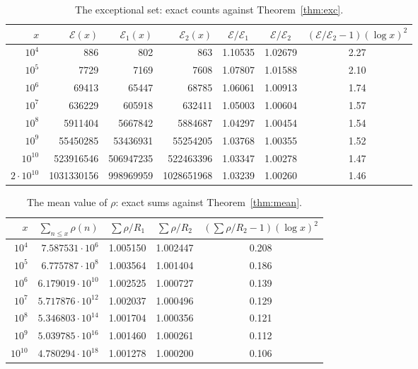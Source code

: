 \documentclass[11pt]{article}
\theoremstyle{definition}
\newcommand{\E}{\mathcal{E}}
\begin{document}
\begin{table}[htbp]
\centering
\caption{The exceptional set: exact counts against Theorem~\ref{thm:exc}.}
\label{tab:exc}
\small
\begin{tabular}{rrrrccc}
\toprule
$x$ & $\E(x)$ & $\E_1(x)$ & $\E_2(x)$ & $\E/\E_1$ & $\E/\E_2$ & $(\E/\E_2-1)(\log x)^2$\\
\midrule
$10^{4}$ & 886 & 802 & 863 & 1.10535 & 1.02679 & 2.27 \\
$10^{5}$ & 7729 & 7169 & 7608 & 1.07807 & 1.01588 & 2.10 \\
$10^{6}$ & 69413 & 65447 & 68785 & 1.06061 & 1.00913 & 1.74 \\
$10^{7}$ & 636229 & 605918 & 632411 & 1.05003 & 1.00604 & 1.57 \\
$10^{8}$ & 5911404 & 5667842 & 5884687 & 1.04297 & 1.00454 & 1.54 \\
$10^{9}$ & 55450285 & 53436931 & 55254205 & 1.03768 & 1.00355 & 1.52 \\
$10^{10}$ & 523916546 & 506947235 & 522463396 & 1.03347 & 1.00278 & 1.47 \\
$2\cdot10^{10}$ & 1031330156 & 998969959 & 1028651968 & 1.03239 & 1.00260 & 1.46 \\
\bottomrule
\end{tabular}
\end{table}

\begin{table}[htbp]
\centering
\caption{The mean value of $\rho$: exact sums against Theorem~\ref{thm:mean}.}
\label{tab:mean}
\small
\begin{tabular}{rrccc}
\toprule
$x$ & $\sum_{n\le x}\rho(n)$ & $\sum\rho/R_1$ & $\sum\rho/R_2$ & $(\sum\rho/R_2-1)(\log x)^2$\\
\midrule
$10^{4}$ & $7.587531\cdot10^{6}$ & 1.005150 & 1.002447 & 0.208 \\
$10^{5}$ & $6.775787\cdot10^{8}$ & 1.003564 & 1.001404 & 0.186 \\
$10^{6}$ & $6.179019\cdot10^{10}$ & 1.002525 & 1.000727 & 0.139 \\
$10^{7}$ & $5.717876\cdot10^{12}$ & 1.002037 & 1.000496 & 0.129 \\
$10^{8}$ & $5.346803\cdot10^{14}$ & 1.001704 & 1.000356 & 0.121 \\
$10^{9}$ & $5.039785\cdot10^{16}$ & 1.001460 & 1.000261 & 0.112 \\
$10^{10}$ & $4.780294\cdot10^{18}$ & 1.001278 & 1.000200 & 0.106 \\
\bottomrule
\end{tabular}
\end{table}
\end{document}
